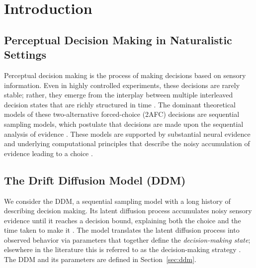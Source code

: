 \documentclass[00-main.tex]{subfiles}
\begin{document}
\section{Introduction}

\subsection{Perceptual Decision Making in Naturalistic Settings}
Perceptual decision making is the process of making decisions based on sensory information. Even in highly controlled experiments, these decisions are rarely stable; rather, they emerge from the interplay between multiple interleaved decision states that are richly structured in time \citep{roy_efficient_2018, roy_extracting_2021, ashwood_mice_2022, duffy_disentangling_2025, urai_structure_2025, danskin_exponential_2023, perquin_temporal_2023, cochrane_multiple_2023}. The dominant theoretical models of these two-alternative forced-choice (2AFC) decisions are sequential sampling models, which postulate that decisions are made upon the sequential analysis of evidence \citep{shadlen_speed_2006, asadpour_rodents_2024}. These models are supported by substantial neural evidence and underlying computational principles that describe the noisy accumulation of evidence leading to a choice \citep{shadlen_speed_2006, steinemann_direct_2024, bogacz_physics_2006, asadpour_rodents_2024, deakin_support_2024}.

\subsection{The Drift Diffusion Model (DDM)}
We consider the DDM, a sequential sampling model with a long history of describing decision making. Its latent diffusion process accumulates noisy sensory evidence until it reaches a decision bound, explaining both the choice and the time taken to make it \citep{stone_models_1960, ratcliff_theory_1978, shadlen_neural_2001}. The model translates the latent diffusion process into observed behavior via parameters that together define the \emph{decision-making state}; elsewhere in the literature this is referred to as the decision-making strategy \citep{ashwood_mice_2022, roy_efficient_2018, roy_extracting_2021}. The DDM and its parameters are defined in Section~\ref{sec:ddm}.
\end{document}
